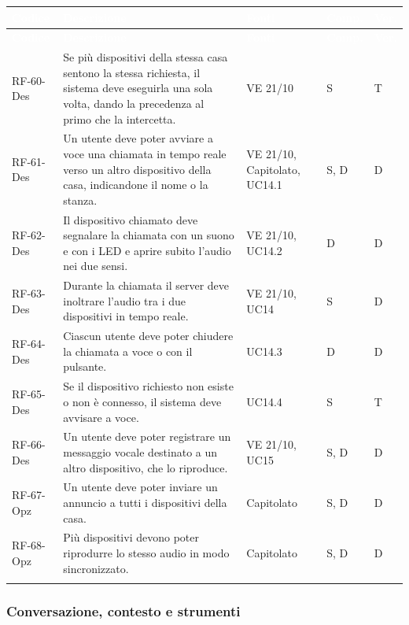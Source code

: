 \documentclass[12pt,a4paper]{article}
\newcommand{\thc}[1]{\textcolor{white}{\textbf{#1}}}
\newcommand{\rl}{\\ \arrayrulecolor{bfline}\hline}
\begin{document}
\begin{longtable}{>{\raggedright\arraybackslash}p{}>{\raggedright\arraybackslash}p{}>{\raggedright\arraybackslash}p{}>{\raggedright\arraybackslash}p{}>{\centering\arraybackslash}p{}}
\rowcolor{bfblue}\thc{Codice} & \thc{Descrizione} & \thc{Fonti} & \thc{Comp.} & \thc{Ver.} \\
\endfirsthead
\rowcolor{bfblue}\thc{Codice} & \thc{Descrizione} & \thc{Fonti} & \thc{Comp.} & \thc{Ver.} \\
\endhead
RF-60-Des & Se più dispositivi della stessa casa sentono la stessa richiesta, il sistema deve eseguirla una sola volta, dando la precedenza al primo che la intercetta. & VE 21/10 & S & T \rl
RF-61-Des & Un utente deve poter avviare a voce una chiamata in tempo reale verso un altro dispositivo della casa, indicandone il nome o la stanza. & VE 21/10, Capitolato, UC14.1 & S, D & D \rl
RF-62-Des & Il dispositivo chiamato deve segnalare la chiamata con un suono e con i LED e aprire subito l'audio nei due sensi. & VE 21/10, UC14.2 & D & D \rl
RF-63-Des & Durante la chiamata il server deve inoltrare l'audio tra i due dispositivi in tempo reale. & VE 21/10, UC14 & S & D \rl
RF-64-Des & Ciascun utente deve poter chiudere la chiamata a voce o con il pulsante. & UC14.3 & D & D \rl
RF-65-Des & Se il dispositivo richiesto non esiste o non è connesso, il sistema deve avvisare a voce. & UC14.4 & S & T \rl
RF-66-Des & Un utente deve poter registrare un messaggio vocale destinato a un altro dispositivo, che lo riproduce. & VE 21/10, UC15 & S, D & D \rl
RF-67-Opz & Un utente deve poter inviare un annuncio a tutti i dispositivi della casa. & Capitolato & S, D & D \rl
RF-68-Opz & Più dispositivi devono poter riprodurre lo stesso audio in modo sincronizzato. & Capitolato & S, D & D \rl
\end{longtable}

\subsubsection{Conversazione, contesto e strumenti}
\end{document}
